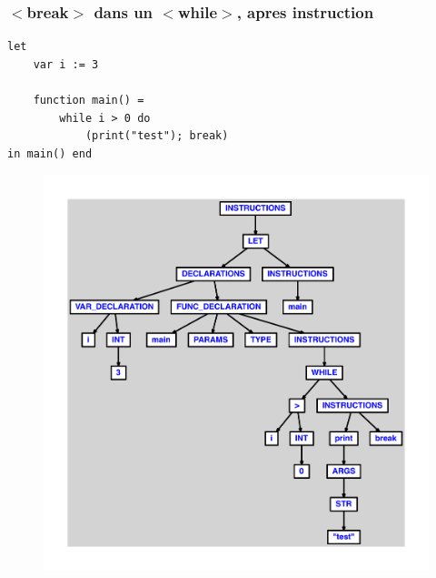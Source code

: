\documentclass{article}
\begin{document}
\subsubsection{$ < $break$ > $ dans un $ < $while$ > $, apres instruction}
\begin{lstlisting}
let
	var i := 3

	function main() =
		while i > 0 do
			(print("test"); break)
in main() end
\end{lstlisting}
\newpage
\begin{figure}[H]
\centering
\includegraphics[max width=\textwidth]{ast/ast_14.pdf}
\end{figure}
\newpage
\end{document}
